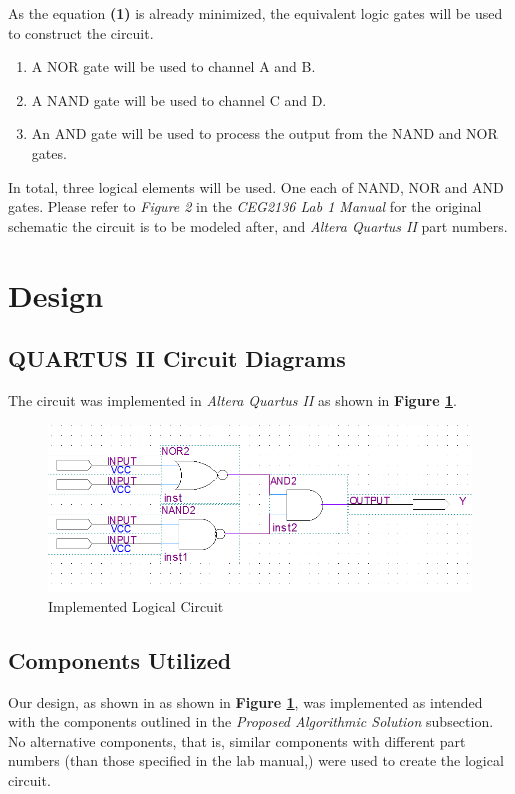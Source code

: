 \documentclass[a4paper,12pt]{article}
\begin{document}
As the equation \textbf{(1)} is already minimized, the equivalent logic gates will be used to construct the circuit. 
\begin{enumerate}
\item A NOR gate will be used to channel A and B.
\item A NAND gate will be used to channel C and D.
\item An AND gate will be used to process the output from the NAND and NOR gates.
\end{enumerate}

In total, three logical elements will be used. One each of NAND, NOR and AND gates. Please refer to \textit{Figure 2} in the \textit{CEG2136 Lab 1 Manual} for the original schematic the circuit is to be modeled after, and \textit{Altera Quartus II} part numbers. 




\section{Design}

\subsection{QUARTUS II Circuit Diagrams}

The circuit was implemented in \textit{Altera Quartus II} as shown in \textbf{Figure \ref{fig:Circ1}}.

\begin{figure}[H]
\includegraphics[width=\textwidth]{Images/Schematic2.PNG} 
\caption{Implemented Logical Circuit}
\label{fig:Circ1}
\end{figure}


\subsection{Components Utilized}

Our design, as shown in as shown in \textbf{Figure \ref{fig:Circ1}}, was implemented as intended with the components outlined in the \textit{Proposed Algorithmic Solution} subsection. No alternative components, that is, similar components with different part numbers (than those specified in the lab manual,) were used to create the logical circuit.
\end{document}
